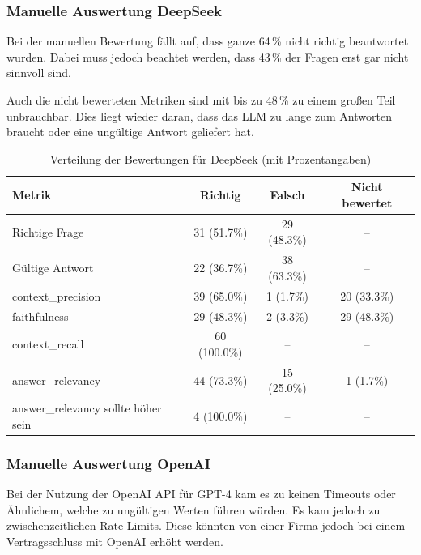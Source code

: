 \subsubsection{Manuelle Auswertung DeepSeek}
Bei der manuellen Bewertung fällt auf, dass ganze 64\,\% nicht richtig beantwortet wurden. Dabei muss jedoch beachtet werden, dass 43\,\% der Fragen erst gar nicht sinnvoll sind.

Auch die nicht bewerteten Metriken sind mit bis zu 48\,\% zu einem großen Teil unbrauchbar. Dies liegt wieder daran, dass das LLM zu lange zum Antworten braucht oder eine ungültige Antwort geliefert hat.
\begin{table}[h!]
    \centering
    \begin{tabular}{|l|c|c|c|}
    \hline
    \textbf{Metrik} & \textbf{Richtig} & \textbf{Falsch} & \textbf{Nicht bewertet} \\
    \hline
    Richtige Frage                        & 31 (51.7\%)  & 29 (48.3\%)  & -- \\
    Gültige Antwort                       & 22 (36.7\%)  & 38 (63.3\%)  & -- \\
    context\_precision           & 39 (65.0\%)  & 1 (1.7\%)    & 20 (33.3\%) \\
    faithfulness                 & 29 (48.3\%)  & 2 (3.3\%)    & 29 (48.3\%) \\
    context\_recall              & 60 (100.0\%) & --           & -- \\
    answer\_relevancy            & 44 (73.3\%)  & 15 (25.0\%)  & 1 (1.7\%) \\
    answer\_relevancy sollte höher sein & 4 (100.0\%) & --          & -- \\
    \hline
    \end{tabular}
    \caption{Verteilung der Bewertungen für DeepSeek (mit Prozentangaben)}
\end{table}

\subsubsection{Manuelle Auswertung OpenAI}
Bei der Nutzung der OpenAI API für GPT-4 kam es zu keinen Timeouts oder Ähnlichem, welche zu ungültigen Werten führen würden. Es kam jedoch zu zwischenzeitlichen Rate Limits. Diese könnten von einer Firma jedoch bei einem Vertragsschluss mit OpenAI erhöht werden.

